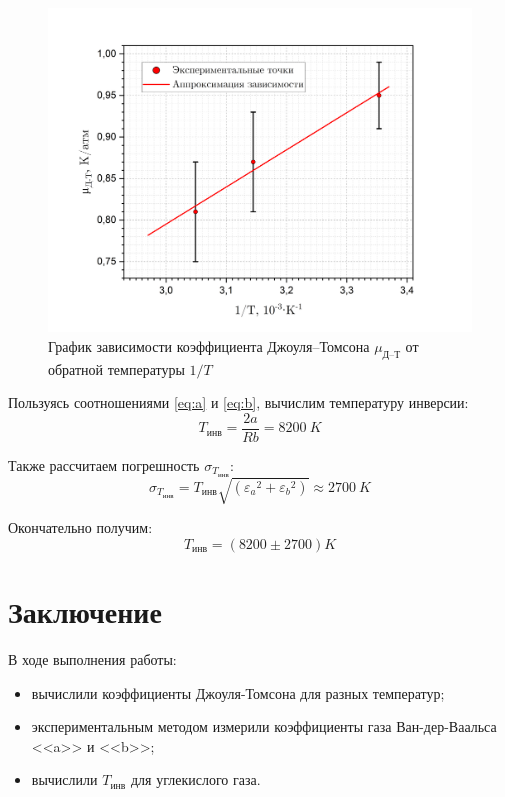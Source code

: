 \documentclass[a4paper, 12pt]{article}
\begin{document}
    \begin{figure}[H]
        \centering
        \includegraphics[width=14cm]{images/graph_mu.png}
        \caption{График зависимости коэффициента Джоуля–Томсона $\mu_\text{Д--Т}$ от обратной температуры $1/T$}
        \label{graph_mu}
    \end{figure}

    \noindent Пользуясь соотношениями \ref{eq:a} и \ref{eq:b}, вычислим температуру инверсии:
    \begin{equation}
        T_{\text{инв}} = \frac{2a}{Rb} = 8200 \: K 
    \end{equation}

    \noindent Также рассчитаем погрешность $\sigma_{T_{инв}}$:
    \begin{equation*}
        \sigma_{T_{инв}} = T_{инв}\sqrt{\left( {\varepsilon_a}^2 + {\varepsilon_b}^2 \right)} \approx 2700 \: K
    \end{equation*}

    \noindent Окончательно получим:
    $$
    \boxed{T_{инв} = \left( 8200 \pm 2700 \right) K}
    $$
    
    \section*{Заключение}

    \noindent В ходе выполнения работы:
    \begin{itemize}
        \item вычислили коэффициенты Джоуля-Томсона для разных температур;
        \item экспериментальным методом измерили коэффициенты газа Ван-дер-Ваальса <<a>> и <<b>>;
        \item вычислили $T_\text{инв}$ для углекислого газа.
    \end{itemize}
\end{document}
